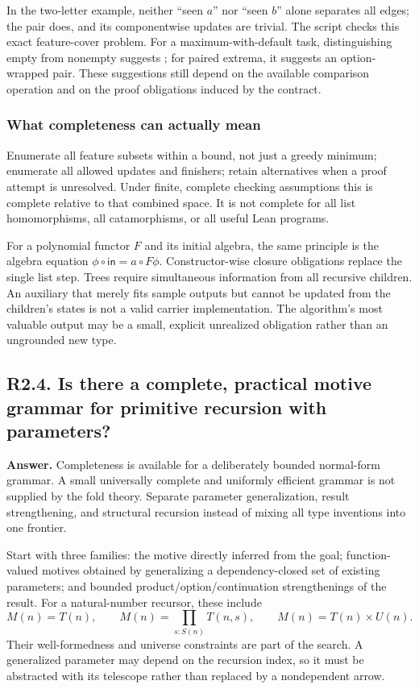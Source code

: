 \documentclass[11pt,a4paper]{article}
\newcommand{\code}[1]{\texttt{\detokenize{#1}}}
\newcommand{\question}[2]{\subsection{#1. #2}\label{q:#1}}
\theoremstyle{definition}
\theoremstyle{remark}
\begin{document}
In the two-letter example, neither ``seen $a$'' nor ``seen $b$'' alone separates all edges; the pair does, and its componentwise updates are trivial. The script checks this exact feature-cover problem. For a maximum-with-default task, distinguishing empty from nonempty suggests \code{Option A}; for paired extrema, it suggests an option-wrapped pair. These suggestions still depend on the available comparison operation and on the proof obligations induced by the contract.

\subsubsection*{What completeness can actually mean}

Enumerate all feature subsets within a bound, not just a greedy minimum; enumerate all allowed updates and finishers; retain alternatives when a proof attempt is unresolved. Under finite, complete checking assumptions this is complete relative to that combined space. It is not complete for all list homomorphisms, all catamorphisms, or all useful Lean programs.

For a polynomial functor $F$ and its initial algebra, the same principle is the algebra equation $\phi\circ\mathsf{in}=a\circ F\phi$. Constructor-wise closure obligations replace the single list step. Trees require simultaneous information from all recursive children. An auxiliary that merely fits sample outputs but cannot be updated from the children's states is not a valid carrier implementation. The algorithm's most valuable output may be a small, explicit unrealized obligation rather than an ungrounded new type.

\question{R2.4}{Is there a complete, practical motive grammar for primitive recursion with parameters?}

\textbf{Answer.} Completeness is available for a deliberately bounded normal-form grammar. A small universally complete and uniformly efficient grammar is not supplied by the fold theory. Separate parameter generalization, result strengthening, and structural recursion instead of mixing all type inventions into one frontier.

Start with three families: the motive directly inferred from the goal; function-valued motives obtained by generalizing a dependency-closed set of existing parameters; and bounded product/option/continuation strengthenings of the result. For a natural-number recursor, these include
\[
 M(n)=T(n),\qquad
 M(n)=\prod_{s:S(n)}T(n,s),\qquad
 M(n)=T(n)\times U(n).
\]
Their well-formedness and universe constraints are part of the search. A generalized parameter may depend on the recursion index, so it must be abstracted with its telescope rather than replaced by a nondependent arrow.
\end{document}
